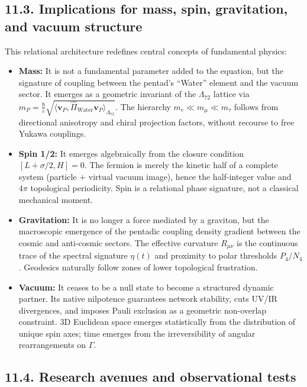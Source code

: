 \documentclass[11pt]{article}
\begin{document}
\hypertarget{implications-for-mass-spin-gravitation-and-vacuum-structure}{%
\subsection{11.3. Implications for mass, spin, gravitation, and vacuum
structure}\label{implications-for-mass-spin-gravitation-and-vacuum-structure}}

This relational architecture redefines central concepts of fundamental
physics:

\begin{itemize}
    \item \textbf{Mass:} It is not a fundamental parameter added to the equation, but the signature of coupling between the pentad's ``Water'' element and the vacuum sector. It emerges as a geometric invariant of the $\Lambda_{72}$ lattice via $m_P = \frac{\hbar}{c} \sqrt{ \langle \mathbf{v}_P, \hat{\Pi}_{\text{Water}} \mathbf{v}_P \rangle_{\Lambda_{72}} }$. The hierarchy $m_e \ll m_\mu \ll m_\tau$ follows from directional anisotropy and chiral projection factors, without recourse to free Yukawa couplings.
    \item \textbf{Spin 1/2:} It emerges algebraically from the closure condition $[L+\sigma/2, H]=0$. The fermion is merely the kinetic half of a complete system (particle $+$ virtual vacuum image), hence the half-integer value and $4\pi$ topological periodicity. Spin is a relational phase signature, not a classical mechanical moment.
    \item \textbf{Gravitation:} It is no longer a force mediated by a graviton, but the macroscopic emergence of the pentadic coupling density gradient between the cosmic and anti-cosmic sectors. The effective curvature $R_{\mu\nu}$ is the continuous trace of the spectral signature $\eta(t)$ and proximity to polar thresholds $P_4/N_4$. Geodesics naturally follow zones of lower topological frustration.
    \item \textbf{Vacuum:} It ceases to be a null state to become a structured dynamic partner. Its native nilpotence guarantees network stability, cuts UV/IR divergences, and imposes Pauli exclusion as a geometric non-overlap constraint. 3D Euclidean space emerges statistically from the distribution of unique spin axes; time emerges from the irreversibility of angular rearrangements on $\Gamma$.
\end{itemize}

\hypertarget{research-avenues-and-observational-tests}{%
\subsection{11.4. Research avenues and observational
tests}\label{research-avenues-and-observational-tests}}
\end{document}
